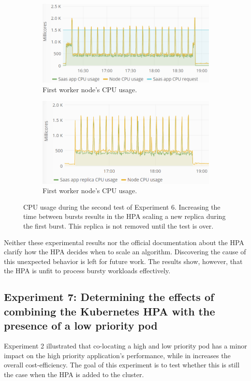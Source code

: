 \begin{figure}
\centering
\begin{subfigure}[b]{\columnwidth}
\centering
\includegraphics[width=0.70\columnwidth]{Images/Experiments/CPU/Grafana/cpu-saas-hpa-bursty-3-1.PNG}
\caption{First worker node's CPU usage.}
\label{fig:cpu-saas-hpa-bursty-3-1}
\end{subfigure}
\hfill
\begin{subfigure}[b]{\columnwidth}
\centering
\includegraphics[width=0.70\columnwidth]{Images/Experiments/CPU/Grafana/cpu-saas-hpa-bursty-3-2.PNG}
\caption{First worker node's CPU usage.}
\label{fig:cpu-saas-hpa-bursty-3-2}
\end{subfigure}
\hfill
\caption{CPU usage during the second test of Experiment 6. Increasing the time between bursts results in the HPA scaling a new replica during the first burst. This replica is not removed until the test is over.}
\label{fig:cpu-saas-hpa-bursty-2}
\end{figure}

Neither these experimental results nor the official documentation about the HPA~\citep{hpa-algorithm-details} clarify how the HPA decides when to scale an algorithm. Discovering the cause of this unexpected behavior is left for future work. The results show, however, that the HPA is unfit to process bursty workloads effectively.




\subsection{Experiment 7: Determining the effects of combining the Kubernetes HPA with the presence of a low priority pod}
Experiment 2 illustrated that co-locating a high and low priority pod has a minor impact on the high priority application's performance, while in increases the overall cost-efficiency. The goal of this experiment is to test whether this is still the case when the HPA is added to the cluster. 

